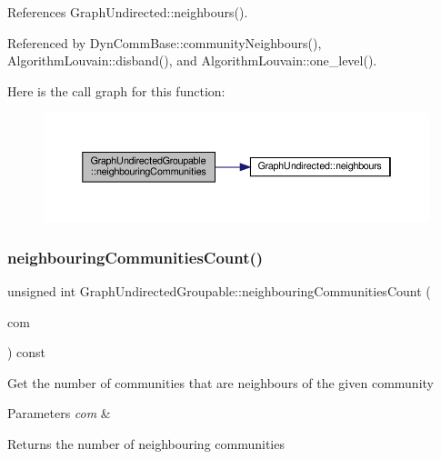 References Graph\+Undirected\+::neighbours().



Referenced by Dyn\+Comm\+Base\+::community\+Neighbours(), Algorithm\+Louvain\+::disband(), and Algorithm\+Louvain\+::one\+\_\+level().

Here is the call graph for this function\+:
\nopagebreak
\begin{figure}[H]
\begin{center}
\leavevmode
\includegraphics[width=350pt]{classGraphUndirectedGroupable_a48823a0162b95a72c22d0ab01a709e1f_cgraph}
\end{center}
\end{figure}
\mbox{\label{classGraphUndirectedGroupable_aaf488071a0e3b6cf96b29ae1af8df02f}} 
\subsubsection{\texorpdfstring{neighbouring\+Communities\+Count()}{neighbouringCommunitiesCount()}}
{\footnotesize\ttfamily unsigned int Graph\+Undirected\+Groupable\+::neighbouring\+Communities\+Count (\begin{DoxyParamCaption}\item[{const \hyperlink{graphUndirectedGroupable_8h_a914da95c9ea7f14f4b7f875c36818556}{type\+Community} \&}]{com }\end{DoxyParamCaption}) const\hspace{0.3cm}{\ttfamily [inline]}}

Get the number of communities that are neighbours of the given community


\begin{DoxyParams}{Parameters}
{\em com} & \\
\hline
\end{DoxyParams}
\begin{DoxyReturn}{Returns}
the number of neighbouring communities 
\end{DoxyReturn}


